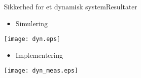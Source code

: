 \begin{frame}{Sikkerhed for et dynamisk system}{Resultater}
\hspace*{-0.5cm}
\begin{minipage}{0.46\textwidth}
	\begin{itemize}
		\item Simulering
	\end{itemize}
\texttt{[image: dyn.eps]}
\end{minipage}
\hspace{0.4cm}
\begin{minipage}{0.46\textwidth}
	\begin{itemize}
		\item Implementering
	\end{itemize}
\texttt{[image: dyn\_meas.eps]}
\end{minipage}

\end{frame}

